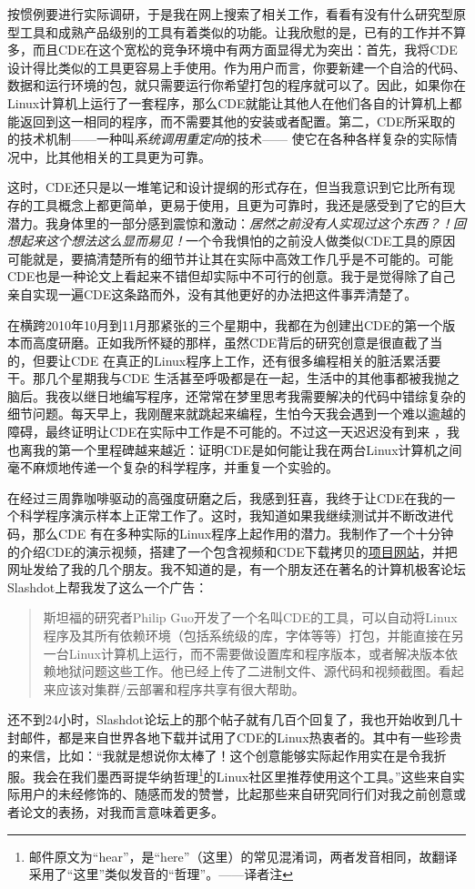 \documentclass[12pt,UTF8,nofonts]{book}
\begin{document}
按惯例要进行实际调研，于是我在网上搜索了相关工作，看看有没有什么研究型原型工具和成熟产品级别的工具有着类似的功能。让我欣慰的是，已有的工作并不算多，而且CDE在这个宽松的竞争环境中有两方面显得尤为突出：首先，我将CDE设计得比类似的工具更容易上手使用。作为用户而言，你要新建一个自洽的代码、数据和运行环境的包，就只需要运行你希望打包的程序就可以了。因此，如果你在Linux计算机上运行了一套程序，那么CDE就能让其他人在他们各自的计算机上都能返回到这一相同的程序，而不需要其他的安装或者配置。第二，CDE所采取的的技术机制——一种叫\emph{系统调用重定向}的技术—— 使它在各种各样复杂的实际情况中，比其他相关的工具更为可靠。

这时，CDE还只是以一堆笔记和设计提纲的形式存在，但当我意识到它比所有现存的工具概念上都更简单，更易于使用，且更为可靠时，我还是感受到了它的巨大潜力。我身体里的一部分感到震惊和激动：\emph{居然之前没有人实现过这个东西？！回想起来这个想法这么显而易见！}一个令我惧怕的之前没人做类似CDE工具的原因可能就是，要搞清楚所有的细节并让其在实际中高效工作几乎是不可能的。可能CDE也是一种论文上看起来不错但却实际中不可行的创意。我于是觉得除了自己亲自实现一遍CDE这条路而外，没有其他更好的办法把这件事弄清楚了。

在横跨2010年10月到11月那紧张的三个星期中，我都在为创建出CDE的第一个版本而高度研磨。正如我所怀疑的那样，虽然CDE背后的研究创意是很直截了当的，但要让CDE 在真正的Linux程序上工作，还有很多编程相关的脏活累活要干。那几个星期我与CDE 生活甚至呼吸都是在一起，生活中的其他事都被我抛之脑后。我夜以继日地编写程序，还常常在梦里思考我需要解决的代码中错综复杂的细节问题。每天早上，我刚醒来就跳起来编程，生怕今天我会遇到一个难以逾越的障碍，最终证明让CDE在实际中工作是不可能的。不过这一天迟迟没有到来 ，我也离我的第一个里程碑越来越近：证明CDE是如何能让我在两台Linux计算机之间毫不麻烦地传递一个复杂的科学程序，并重复一个实验的。

在经过三周靠咖啡驱动的高强度研磨之后，我感到狂喜，我终于让CDE在我的一个科学程序演示样本上正常工作了。这时，我知道如果我继续测试并不断改进代码，那么CDE 有在多种实际的Linux程序上起作用的潜力。我制作了一个十分钟的介绍CDE的演示视频，搭建了一个包含视频和CDE下载拷贝的\href{http://www.pgbovine.net/cde.html}{项目网站}，并把网址发给了我的几个朋友。我不知道的是，有一个朋友还在著名的计算机极客论坛Slashdot上帮我发了这么一个广告：
\begin{quote}
  斯坦福的研究者Philip Guo开发了一个名叫CDE的工具，可以自动将Linux程序及其所有依赖环境（包括系统级的库，字体等等）打包，并能直接在另一台Linux计算机上运行，而不需要做设置库和程序版本，或者解决版本依赖地狱问题这些工作。他已经上传了二进制文件、源代码和视频截图。看起来应该对集群/云部署和程序共享有很大帮助。
\end{quote}
还不到24小时，Slashdot论坛上的那个帖子就有几百个回复了，我也开始收到几十封邮件，都是来自世界各地下载并试用了CDE的Linux热衷者的。其中有一些珍贵的来信，比如：“我就是想说你太棒了！这个创意能够实际起作用实在是令我折服。我会在我们墨西哥提华纳哲理\footnote{邮件原文为``hear''，是``here''（这里）的常见混淆词，两者发音相同，故翻译采用了“这里”类似发音的“哲理”。——译者注}的Linux社区里推荐使用这个工具。”这些来自实际用户的未经修饰的、随感而发的赞誉，比起那些来自研究同行们对我之前创意或者论文的表扬，对我而言意味着更多。
\end{document}
